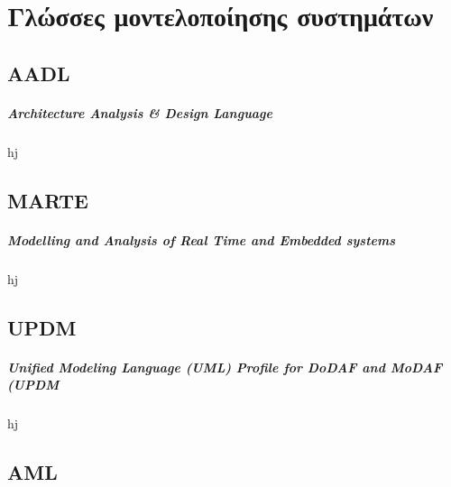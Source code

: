\documentclass[a4paper,12pt,twoside]{report}
\begin{document}
	\chapter{Γλώσσες μοντελοποίησης συστημάτων}
		\label{κεφ.:Γλώσσες μοντελοποίησης συστημάτων}

		\section{AADL}
			\paragraph{Architecture Analysis \& Design Language}{hj}
		\section{MARTE}
			\paragraph{Modelling and Analysis of Real Time and Embedded systems}{hj}
		\section{UPDM}
			\paragraph{Unified Modeling Language (UML) Profile for DoDAF and MoDAF (UPDM}{hj}
		\section{AML}
\end{document}
